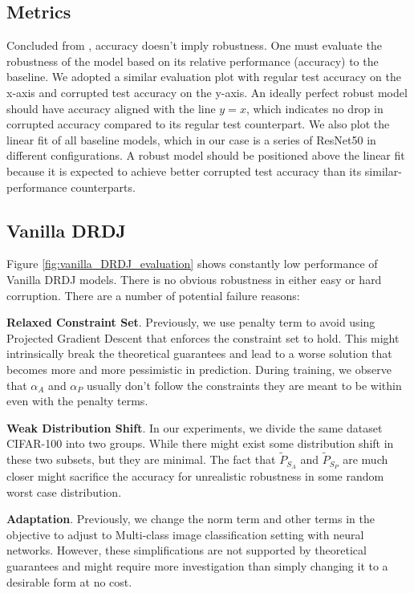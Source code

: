 \documentclass{article}
\begin{document}
\subsection{Metrics}
Concluded from \citep{taori2020measuring}, accuracy doesn't imply robustness. One must 
evaluate the robustness of the model based on its relative performance (accuracy) 
to the baseline. We adopted a similar evaluation plot with regular test accuracy 
on the x-axis and corrupted test accuracy on the y-axis. An ideally perfect 
robust model should have accuracy aligned with the line $y = x$, which indicates 
no drop in corrupted accuracy compared to its regular test counterpart. We also 
plot the linear fit of all baseline models, which in our case is a series of 
ResNet50 in different configurations. A robust model should be positioned above 
the linear fit because it is expected to achieve better corrupted test accuracy 
than its similar-performance counterparts.

\subsection{Vanilla DRDJ}
Figure \ref{fig:vanilla_DRDJ_evaluation} shows constantly low performance of Vanilla DRDJ models. 
There is no obvious robustness in either easy or hard corruption. There are a number of 
potential failure reasons:

\textbf{Relaxed Constraint Set}. Previously, we use penalty term to avoid using Projected 
Gradient Descent that enforces the constraint set to hold. This might intrinsically break 
the theoretical guarantees and lead to a worse solution that becomes more and more pessimistic
in prediction. During training, we observe that $\alpha_A$ and $\alpha_P$ usually don't 
follow the constraints they are meant to be within even with the penalty terms.

\textbf{Weak Distribution Shift}. In our experiments, we divide the same dataset CIFAR-100
into two groups. While there might exist some distribution shift in these two subsets, but 
they are minimal. The fact that $\tilde{P}_{S_A}$ and $\tilde{P}_{S_P}$ are much closer 
might sacrifice the accuracy for unrealistic robustness in some random
worst case distribution.

\textbf{Adaptation}. Previously, we change the norm term and other terms in the objective 
to adjust to Multi-class image classification setting with neural networks. However, 
these simplifications are not supported by theoretical guarantees and might require 
more investigation than simply changing it to a desirable form at no cost.
\end{document}
